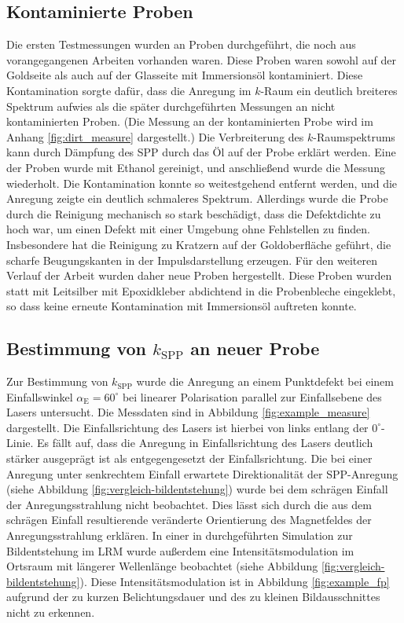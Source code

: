 \documentclass[a4paper, titlepage,  ngerman]{book}
\begin{document}
	\subsection{Kontaminierte Proben}
	Die ersten Testmessungen wurden an Proben durchgeführt, die noch aus vorangegangenen Arbeiten vorhanden waren. Diese Proben waren sowohl auf der Goldseite als auch auf der Glasseite mit Immersionsöl kontaminiert. Diese Kontamination sorgte dafür, dass die Anregung im $k$-Raum ein deutlich breiteres Spektrum aufwies als die später durchgeführten Messungen an nicht kontaminierten Proben. (Die Messung an der kontaminierten Probe wird im Anhang \ref{fig:dirt_measure} dargestellt.) Die Verbreiterung des $k$-Raumspektrums kann durch Dämpfung des SPP durch das Öl auf der Probe erklärt werden. Eine der Proben wurde mit Ethanol gereinigt, und anschließend wurde die Messung wiederholt. Die Kontamination konnte so weitestgehend entfernt werden, und die Anregung zeigte ein deutlich schmaleres Spektrum. Allerdings wurde die Probe durch die Reinigung mechanisch so stark beschädigt, dass die Defektdichte zu hoch war, um einen Defekt mit einer Umgebung ohne Fehlstellen zu finden. Insbesondere hat die Reinigung zu Kratzern auf der Goldoberfläche geführt, die scharfe Beugungskanten in der Impulsdarstellung  erzeugen. Für den weiteren Verlauf der Arbeit wurden daher neue Proben hergestellt. Diese Proben wurden statt mit Leitsilber mit Epoxidkleber abdichtend in die Probenbleche eingeklebt, so dass keine erneute Kontamination mit Immersionsöl auftreten konnte.
	\subsection{Bestimmung von  $k_{\mathrm{SPP}}$ an neuer Probe}
	Zur Bestimmung von $k_{\mathrm{SPP}}$ wurde die Anregung an einem Punktdefekt bei einem Einfallswinkel $\alpha_{\mathrm{E}} = 60^\circ$ bei linearer Polarisation parallel zur Einfallsebene des Lasers untersucht. Die Messdaten sind in Abbildung \ref{fig:example_measure} dargestellt. Die Einfallsrichtung des Lasers ist hierbei von links entlang der $0^\circ$-Linie. Es fällt auf, dass die Anregung in Einfallsrichtung des Lasers deutlich stärker ausgeprägt ist als entgegengesetzt der Einfallsrichtung. Die bei einer Anregung unter senkrechtem Einfall erwartete Direktionalität der SPP-Anregung (siehe Abbildung \ref{fig:vergleich-bildentstehung}) wurde bei dem schrägen Einfall der Anregungsstrahlung nicht beobachtet. Dies lässt sich durch die aus dem schrägen Einfall resultierende veränderte Orientierung des Magnetfeldes der Anregungsstrahlung erklären. In einer in \cite{Hohenau.2011} durchgeführten Simulation zur Bildentstehung im LRM wurde außerdem eine Intensitätsmodulation im Ortsraum mit längerer Wellenlänge beobachtet (siehe Abbildung \ref{fig:vergleich-bildentstehung}). Diese Intensitätsmodulation ist in Abbildung \ref{fig:example_fp} aufgrund der zu kurzen Belichtungsdauer und des zu kleinen Bildausschnittes nicht zu erkennen.
	
\end{document}
